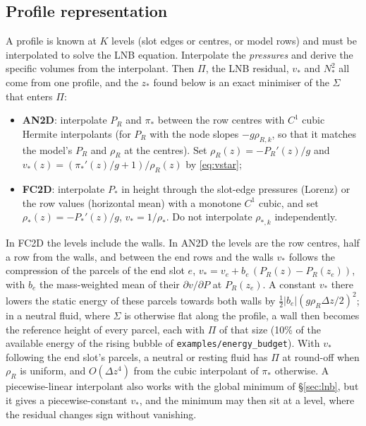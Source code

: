 \documentclass[11pt,a4paper]{article}
\newcommand{\code}[1]{\texttt{#1}}
\newcommand{\zs}{z_{*}}
\begin{document}
\subsection{Profile representation}\label{sec:profile}
A profile is known at $K$ levels (slot edges or centres, or model rows) and must be interpolated to solve the LNB equation.
Interpolate the \emph{pressures} and derive the specific volumes from the interpolant. Then $\Pi$, the LNB residual, $v_*$ and
$N_*^2$ all come from one profile, and the $\zs$ found below is an exact minimiser of the $\Sigma$ that enters $\Pi$:
\begin{itemize}
  \item \textbf{AN2D}: interpolate $P_R$ and $\pi_*$ between the row centres with $C^1$ cubic Hermite interpolants (for
        $P_R$ with the node slopes $-g\rho_{R,k}$, so that it matches the model's $P_R$ and $\rho_R$ at the centres). Set
        $\rho_R(z)=-P_R'(z)/g$ and
        $v_*(z)=\left(\pi_*'(z)/g+1\right)/\rho_R(z)$ by \eqref{eq:vstar};
  \item \textbf{FC2D}: interpolate $P_*$ in height through the slot-edge pressures (Lorenz) or the row values (horizontal
        mean) with a monotone $C^1$ cubic, and set $\rho_*(z)=-P_*'(z)/g$, $v_*=1/\rho_*$. Do not interpolate $\rho_{*,k}$
        independently.
\end{itemize}
In FC2D the levels include the walls. In AN2D the levels are the row centres, half a row from the walls, and between the
end rows and the walls $v_*$ follows the compression of the parcels of the end slot $e$, $v_*=v_e+b_e\,(P_R(z)-P_R(z_e))$, with
$b_e$ the mass-weighted mean of their $\partial v/\partial P$ at $P_R(z_e)$. A constant $v_*$ there lowers the static energy of
these parcels towards both walls by $\tfrac12|b_e|(g\rho_R\Delta z/2)^2$; in a neutral fluid, where $\Sigma$ is otherwise flat
along the profile, a wall then becomes the reference height of every parcel, each with $\Pi$ of that size (10\% of the
available energy of the rising bubble of \code{examples/energy\_budget}). With $v_*$ following the end slot's parcels, a
neutral or resting fluid has $\Pi$ at round-off when $\rho_R$ is uniform, and $O(\Delta z^4)$ from the cubic interpolant of
$\pi_*$ otherwise. A piecewise-linear interpolant also works
with the global minimum of \S\ref{sec:lnb}, but it gives a piecewise-constant $v_*$, and the minimum may then sit at a level,
where the residual changes sign without vanishing.
\end{document}
